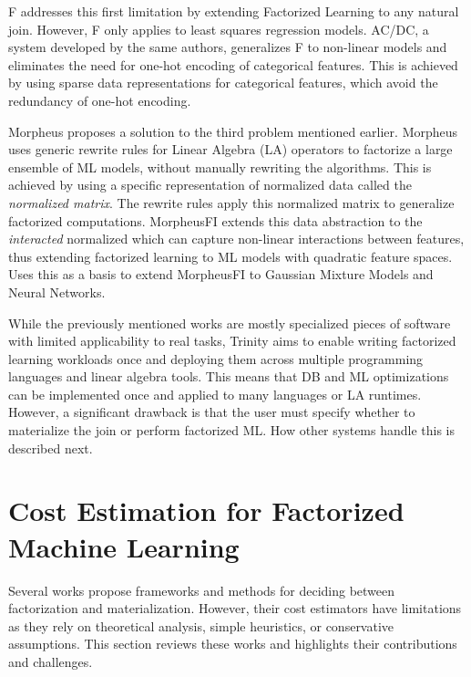 F \cite{f_schleich} addresses this first limitation by extending Factorized Learning to any natural join. However, F only applies to least squares regression models. AC/DC, a system developed by the same authors, generalizes F to non-linear models and eliminates the need for one-hot encoding of categorical features. This is achieved by using sparse data representations for categorical features, which avoid the redundancy of one-hot encoding.

Morpheus \cite{morpheus} proposes a solution to the third problem mentioned earlier. Morpheus uses generic rewrite rules for Linear Algebra (LA) operators to factorize a large ensemble of ML models, without manually rewriting the algorithms. This is achieved by using a specific representation of normalized data called the \textit{normalized matrix}. The rewrite rules apply this normalized matrix to generalize factorized computations. MorpheusFI \cite{MorpheusFIEnablingOptimizingNonlinear2019} extends this data abstraction to the \textit{interacted} normalized which can capture non-linear interactions between features, thus extending factorized learning to ML models with quadratic feature spaces. \cite{f_gmm_DBLP:conf/icde/ChengKZ021} Uses this as a basis to extend MorpheusFI to Gaussian Mixture Models and Neural Networks.

While the previously mentioned works are mostly specialized pieces of software with limited applicability to real tasks, Trinity \cite{TrinityPolyglotFrameworkFactorized2021} aims to enable writing factorized learning workloads once and deploying them across multiple programming languages and linear algebra tools. This means that DB and ML optimizations can be implemented once and applied to many languages or LA runtimes. However, a significant drawback is that the user must specify whether to materialize the join or perform factorized ML. How other systems handle this is described next.

\section{Cost Estimation for Factorized Machine Learning}
\label{sec:3-cost-estimation-for-factorized-ml}
Several works propose frameworks and methods for deciding between factorization and materialization. However, their cost estimators have limitations as they rely on theoretical analysis, simple heuristics, or conservative assumptions. This section reviews these works and highlights their contributions and challenges.

